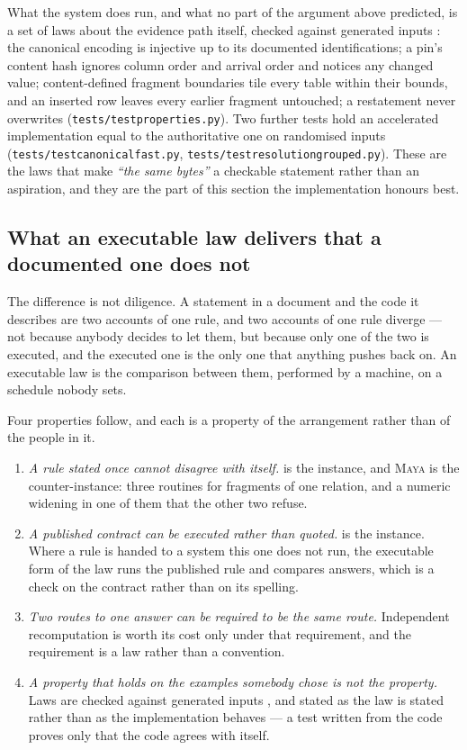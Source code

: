 \documentclass[11pt,a4paper]{article}
\renewcommand{\_}{\oldunderscore\allowbreak}
\theoremstyle{plain}
\theoremstyle{definition}
\theoremstyle{definition}
\theoremstyle{remark}
\begin{document}
What the system does run, and what no part of the argument above predicted, is a set of laws about the
evidence path itself,
checked against generated inputs \cite{claessen2000}: the canonical encoding is injective up to its
documented identifications; a pin's content hash ignores column order and arrival order and notices any
changed value; content-defined fragment boundaries tile every table within their bounds, and an inserted
row leaves every earlier fragment untouched; a restatement never overwrites
(\texttt{tests/test\_properties.py}). Two further tests hold an accelerated implementation equal to the
authoritative one on randomised inputs (\texttt{tests/test\_canonical\_fast.py},
\texttt{tests/test\_resolution\_grouped.py}). These are the laws that make \emph{``the same bytes''} a
checkable statement rather than an aspiration, and they are the part of this section the implementation
honours best.

\subsection{What an executable law delivers that a documented one does not}

The difference is not diligence. A statement in a document and the code it describes are two accounts of
one rule, and two accounts of one rule diverge --- not because anybody decides to let them, but because
only one of the two is executed, and the executed one is the only one that anything pushes back on. An
executable law is the comparison between them, performed by a machine, on a schedule nobody sets.

Four properties follow, and each is a property of the arrangement rather than of the people in it.

\begin{enumerate}[leftmargin=*,itemsep=3pt]
\item \emph{A rule stated once cannot disagree with itself.}  is the instance, and
      \textsc{Maya} is the counter-instance: three routines for fragments of one relation, and a
      numeric widening in one of them that the other two refuse.
\item \emph{A published contract can be executed rather than quoted.}  is the
      instance. Where a rule is handed to a system this one does not run, the executable form of the law
      runs the published rule and compares answers, which is a check on the contract rather than on its
      spelling.
\item \emph{Two routes to one answer can be required to be the same route.} Independent recomputation is
      worth its cost only under that requirement, and the requirement is a law rather than a convention.
\item \emph{A property that holds on the examples somebody chose is not the property.} Laws are checked
      against generated inputs \cite{claessen2000}, and stated as the law is stated rather than as the
      implementation behaves --- a test written from the code proves only that the code agrees with
      itself.
\end{enumerate}
\end{document}
